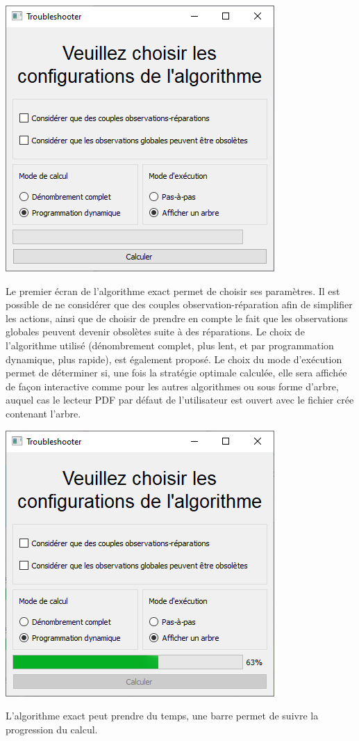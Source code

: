 \documentclass[a4paper,11pt]{article}
\theoremstyle{plain}
\theoremstyle{definition}
\begin{document}
\begin{center}
\includegraphics[scale=0.667]{Figures/exato_1}
\end{center}
Le premier écran de l'algorithme exact permet de choisir ses paramètres. Il est possible de ne considérer que des couples observation-réparation afin de simplifier les actions, ainsi que de choisir de prendre en compte le fait que les observations globales peuvent devenir obsolètes suite à des réparations. Le choix de l'algorithme utilisé (dénombrement complet, plus lent, et par programmation dynamique, plus rapide), est également proposé. Le choix du mode d'exécution permet de déterminer si, une fois la stratégie optimale calculée, elle sera affichée de façon interactive comme pour les autres algorithmes ou sous forme d'arbre, auquel cas le lecteur PDF par défaut de l'utilisateur est ouvert avec le fichier crée contenant l'arbre.

\begin{center}
\includegraphics[scale=0.667]{Figures/exato_2}
\end{center}
L'algorithme exact peut prendre du temps, une barre permet de suivre la progression du calcul.
\end{document}
